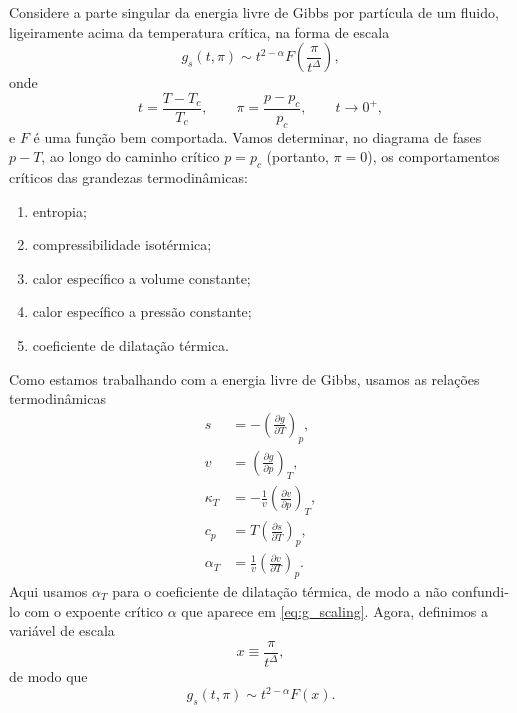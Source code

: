 \documentclass[11pt,a4paper]{article}
\begin{document}
Considere a parte singular da energia livre de Gibbs por partícula de um
fluido, ligeiramente acima da temperatura crítica, na forma de escala
\begin{equation}
    g_s(t,\pi)
    \sim
    t^{2-\alpha}
    F\!\left(\frac{\pi}{t^{\Delta}}\right),
    \label{eq:g_scaling}
\end{equation}
onde
\begin{equation}
    t = \frac{T-T_c}{T_c},
    \qquad
    \pi = \frac{p-p_c}{p_c},
    \qquad
    t \to 0^+,
    \label{eq:variables}
\end{equation}
e \(F\) é uma função bem comportada. Vamos determinar, no diagrama de fases $p-T$, ao longo do caminho crítico \(p=p_c\) (portanto, \(\pi=0\)), os comportamentos críticos das grandezas termodinâmicas:
%
\begin{enumerate}
    \item entropia;
    \item compressibilidade isotérmica;
    \item calor específico a volume constante;
    \item calor específico a pressão constante;
    \item coeficiente de dilatação térmica.
\end{enumerate}
%
Como estamos trabalhando com a energia livre de Gibbs, usamos as relações
termodinâmicas
%
\begin{align}
    s &= -\left(\frac{\partial g}{\partial T}\right)_p,
    \label{eq:s}\\
    v &= \left(\frac{\partial g}{\partial p}\right)_T,
    \label{eq:v}\\
    \kappa_T
    &= -\frac{1}{v}
    \left(\frac{\partial v}{\partial p}\right)_T,
    \label{eq:kappa}\\
    c_p
    &= T\left(\frac{\partial s}{\partial T}\right)_p,
    \label{eq:cp}\\
    \alpha_T
    &= \frac{1}{v}
    \left(\frac{\partial v}{\partial T}\right)_p.
    \label{eq:alphaT}
\end{align}
%
Aqui usamos \(\alpha_T\) para o coeficiente de dilatação térmica, de modo a não
confundi-lo com o expoente crítico \(\alpha\) que aparece em \eqref{eq:g_scaling}. Agora, definimos a variável de escala
%
\begin{equation}
    x \equiv \frac{\pi}{t^{\Delta}},
    \label{eq:x}
\end{equation}
%
de modo que
%
\begin{equation}
    g_s(t,\pi) \sim t^{2-\alpha}F(x).
    \label{eq:gx}
\end{equation}
\end{document}

